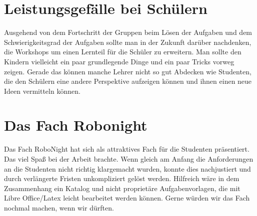 \section{Leistungsgefälle bei Schülern}
Ausgehend von dem Fortschritt der Gruppen beim Lösen der Aufgaben und dem Schwierigkeitsgrad der Aufgaben sollte man in der Zukunft darüber nachdenken, die Workshops um einen Lernteil für die Schüler zu erweitern. Man sollte den Kindern vielleicht ein paar grundlegende Dinge und ein paar Tricks vorweg zeigen. Gerade das können manche Lehrer nicht so gut Abdecken wie Studenten, die den Schülern eine andere Perspektive aufzeigen können und ihnen einen neue Ideen vermitteln können. 
    
\section{Das Fach Robonight}
Das Fach RoboNight hat sich als attraktives Fach für die Studenten präsentiert. Das viel Spaß bei der Arbeit brachte. Wenn gleich am Anfang die Anforderungen an die Studenten nicht richtig klargemacht wurden, konnte dies nachjustiert und durch verlängerte Fristen unkompliziert gelöst werden. Hilfreich wäre in dem Zusammenhang ein Katalog und nicht proprietäre Aufgabenvorlagen, die mit Libre Office/Latex leicht bearbeitet werden können. Gerne würden wir das Fach nochmal machen, wenn wir dürften. 
    
  
    